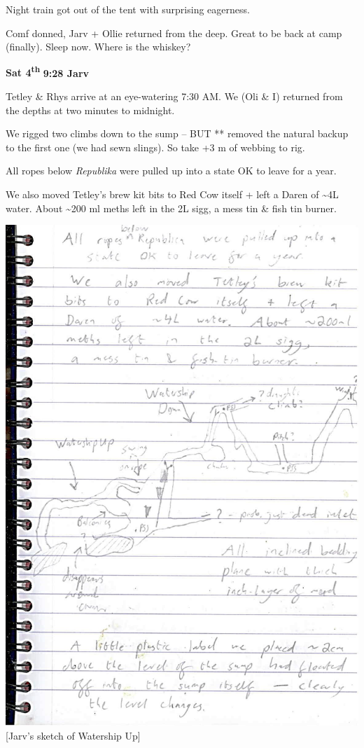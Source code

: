 Night train got out of the tent with surprising eagerness.

Comf donned, Jarv + Ollie returned from the deep. Great to be back at
camp (finally). Sleep now. Where is the whiskey?

\textbf{Sat 4\textsuperscript{th}} \textbf{9:28 Jarv}

Tetley \& Rhys arrive at an eye-watering 7:30 AM. We (Oli \& I) returned
from the depths at two minutes to midnight.

We rigged two climbs down to the sump -- BUT ** removed the natural
backup to the first one (we had sewn slings). So take +3 m of webbing to
rig.

All ropes below \emph{Republika} were pulled up into a state OK to leave
for a year.

We also moved Tetley's brew kit bits to Red Cow itself + left a Daren of
\textasciitilde 4L water. About \textasciitilde 200 ml meths left in the
2L sigg, a mess tin \& fish tin burner.

\includegraphics{UgLog1012/86.jpeg}\\
{[}Jarv's sketch of Watership Up{]}

